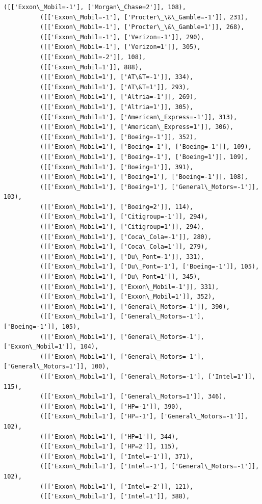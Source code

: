 \documentclass[11pt]{article}
\begin{document}
\begin{Verbatim}[commandchars=\\\{\}]
          ([['Exxon\_Mobil=-1'], ['Morgan\_Chase=2']], 108),
          ([['Exxon\_Mobil=-1'], ['Procter\_\&\_Gamble=-1']], 231),
          ([['Exxon\_Mobil=-1'], ['Procter\_\&\_Gamble=1']], 268),
          ([['Exxon\_Mobil=-1'], ['Verizon=-1']], 290),
          ([['Exxon\_Mobil=-1'], ['Verizon=1']], 305),
          ([['Exxon\_Mobil=-2']], 108),
          ([['Exxon\_Mobil=1']], 888),
          ([['Exxon\_Mobil=1'], ['AT\&T=-1']], 334),
          ([['Exxon\_Mobil=1'], ['AT\&T=1']], 293),
          ([['Exxon\_Mobil=1'], ['Altria=-1']], 269),
          ([['Exxon\_Mobil=1'], ['Altria=1']], 305),
          ([['Exxon\_Mobil=1'], ['American\_Express=-1']], 313),
          ([['Exxon\_Mobil=1'], ['American\_Express=1']], 306),
          ([['Exxon\_Mobil=1'], ['Boeing=-1']], 352),
          ([['Exxon\_Mobil=1'], ['Boeing=-1'], ['Boeing=-1']], 109),
          ([['Exxon\_Mobil=1'], ['Boeing=-1'], ['Boeing=1']], 109),
          ([['Exxon\_Mobil=1'], ['Boeing=1']], 391),
          ([['Exxon\_Mobil=1'], ['Boeing=1'], ['Boeing=-1']], 108),
          ([['Exxon\_Mobil=1'], ['Boeing=1'], ['General\_Motors=-1']], 103),
          ([['Exxon\_Mobil=1'], ['Boeing=2']], 114),
          ([['Exxon\_Mobil=1'], ['Citigroup=-1']], 294),
          ([['Exxon\_Mobil=1'], ['Citigroup=1']], 294),
          ([['Exxon\_Mobil=1'], ['Coca\_Cola=-1']], 280),
          ([['Exxon\_Mobil=1'], ['Coca\_Cola=1']], 279),
          ([['Exxon\_Mobil=1'], ['Du\_Pont=-1']], 331),
          ([['Exxon\_Mobil=1'], ['Du\_Pont=-1'], ['Boeing=-1']], 105),
          ([['Exxon\_Mobil=1'], ['Du\_Pont=1']], 345),
          ([['Exxon\_Mobil=1'], ['Exxon\_Mobil=-1']], 331),
          ([['Exxon\_Mobil=1'], ['Exxon\_Mobil=1']], 352),
          ([['Exxon\_Mobil=1'], ['General\_Motors=-1']], 390),
          ([['Exxon\_Mobil=1'], ['General\_Motors=-1'], ['Boeing=-1']], 105),
          ([['Exxon\_Mobil=1'], ['General\_Motors=-1'], ['Exxon\_Mobil=1']], 104),
          ([['Exxon\_Mobil=1'], ['General\_Motors=-1'], ['General\_Motors=1']], 100),
          ([['Exxon\_Mobil=1'], ['General\_Motors=-1'], ['Intel=1']], 115),
          ([['Exxon\_Mobil=1'], ['General\_Motors=1']], 346),
          ([['Exxon\_Mobil=1'], ['HP=-1']], 390),
          ([['Exxon\_Mobil=1'], ['HP=-1'], ['General\_Motors=-1']], 102),
          ([['Exxon\_Mobil=1'], ['HP=1']], 344),
          ([['Exxon\_Mobil=1'], ['HP=2']], 115),
          ([['Exxon\_Mobil=1'], ['Intel=-1']], 371),
          ([['Exxon\_Mobil=1'], ['Intel=-1'], ['General\_Motors=-1']], 102),
          ([['Exxon\_Mobil=1'], ['Intel=-2']], 121),
          ([['Exxon\_Mobil=1'], ['Intel=1']], 388),

\end{Verbatim}
\end{document}

